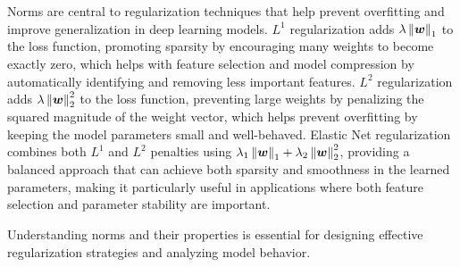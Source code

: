 Norms are central to regularization techniques that help prevent overfitting and improve generalization in deep learning models. $L^1$ regularization adds $\lambda\left\lVert\boldsymbol{w}\right\rVert_1$ to the loss function, promoting sparsity by encouraging many weights to become exactly zero, which helps with feature selection and model compression by automatically identifying and removing less important features. $L^2$ regularization adds $\lambda\left\lVert\boldsymbol{w}\right\rVert_2^2$ to the loss function, preventing large weights by penalizing the squared magnitude of the weight vector, which helps prevent overfitting by keeping the model parameters small and well-behaved. Elastic Net regularization combines both $L^1$ and $L^2$ penalties using $\lambda_1\left\lVert\boldsymbol{w}\right\rVert_1 + \lambda_2\left\lVert\boldsymbol{w}\right\rVert_2^2$, providing a balanced approach that can achieve both sparsity and smoothness in the learned parameters, making it particularly useful in applications where both feature selection and parameter stability are important.

Understanding norms and their properties is essential for designing effective regularization strategies and analyzing model behavior.

